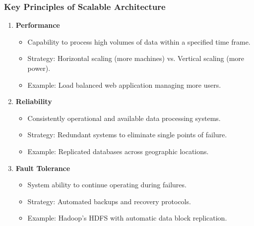 \documentclass{beamer}
\begin{document}
\begin{frame}
    \frametitle{Key Principles of Scalable Architecture}
    \begin{enumerate}
        \item \textbf{Performance} 
            \begin{itemize}
                \item Capability to process high volumes of data within a specified time frame.
                \item Strategy: Horizontal scaling (more machines) vs. Vertical scaling (more power).
                \item Example: Load balanced web application managing more users.
            \end{itemize}
        
        \item \textbf{Reliability} 
            \begin{itemize}
                \item Consistently operational and available data processing systems.
                \item Strategy: Redundant systems to eliminate single points of failure.
                \item Example: Replicated databases across geographic locations.
            \end{itemize}
        
        \item \textbf{Fault Tolerance} 
            \begin{itemize}
                \item System ability to continue operating during failures.
                \item Strategy: Automated backups and recovery protocols.
                \item Example: Hadoop's HDFS with automatic data block replication.
            \end{itemize}
    \end{enumerate}
\end{frame}
\end{document}
